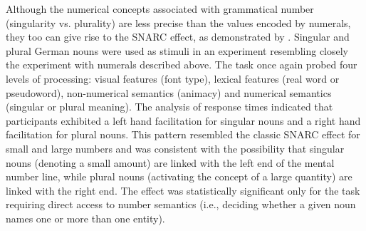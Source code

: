 \documentclass[output=paper]{langscibook}
\begin{document}
Although the numerical concepts associated with grammatical number (singularity vs. plurality) are less precise than the values encoded by numerals,   they too can give rise to the SNARC effect, as demonstrated by \citet{rottgerGrammaticalNumberElicits2015}. Singular and plural German nouns were used as stimuli in an experiment resembling closely the experiment with numerals described above. The task once again probed four levels of processing: visual features (font type), lexical features (real word or pseudoword), non-numerical semantics (animacy) and numerical semantics (singular or plural meaning). The analysis of response times indicated that participants exhibited a left hand facilitation for singular nouns and a right hand facilitation for plural nouns. This pattern resembled the classic SNARC effect for small and large numbers and was consistent with the possibility that singular nouns (denoting a small amount) are linked with the left end of the mental number line, while plural nouns (activating the concept of a large quantity) are linked with the right end. The effect was statistically significant only for the task requiring direct access to number semantics (i.e., deciding whether a given noun names one or more than one entity). 
\end{document}
